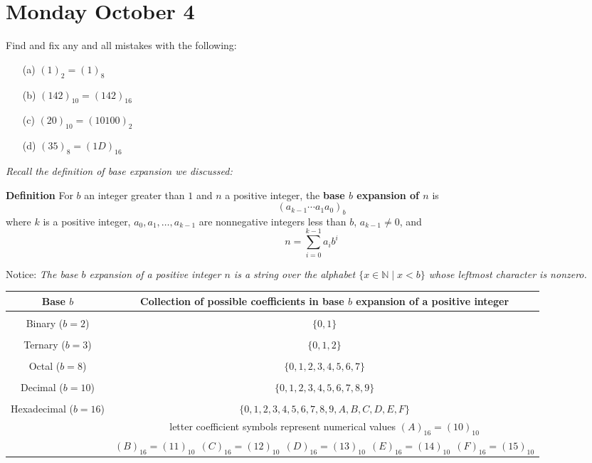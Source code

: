 \documentclass[12pt, oneside]{article}
\newcommand{\st}{\mid}
\begin{document}
\begin{flushright}
\end{flushright} 


\section*{Monday October 4}


Find and fix any and all mistakes with the following:
\begin{itemize}
\item[(a)] $(1)_2 = (1)_8$
\item[(b)] $(142)_{10} = (142)_{16}$
\item[(c)] $(20)_{10} = (10100)_2$
\item[(d)] $(35)_8 = (1D)_{16}$
\end{itemize} 

{\it Recall the definition of base expansion we discussed:}



{\bf Definition} For $b$ an integer greater than $1$ and $n$ a positive integer, 
the {\bf base $b$ expansion of $n$}  is
\[
(a_{k-1} \cdots a_1 a_0)_b
\]
where $k$ is a positive integer, $a_0, a_1, \ldots, a_{k-1}$ 
are nonnegative integers less than $b$, $a_{k-1} \neq  0$, and
\[
n =  \sum_{i=0}^{k-1} a_{i} b^{i}
\]

Notice: {\it The base $b$ expansion of a positive integer $n$ is a string over the alphabet 
$\{x \in \mathbb{N} \st x < b\}$
whose leftmost character is nonzero.}

\begin{center}
\begin{tabular}{|c|c|}
\hline
Base $b$ & Collection of possible coefficients in base $b$ expansion of  a positive integer \\
\hline
& \\
Binary ($b=2$) & $\{0,1\}$ \\
\hline
& \\
Ternary ($b=3$) & $\{0,1, 2\}$ \\
\hline
& \\
Octal ($b=8$) & $\{0,1, 2, 3, 4, 5, 6, 7\}$\\
\hline
& \\
Decimal ($b=10$) & $\{0,1, 2, 3, 4, 5, 6, 7, 8, 9\}$\\
\hline
& \\
Hexadecimal ($b=16$) &  $\{0,1, 2, 3, 4, 5, 6, 7, 8, 9, A, B, C, D, E, F\}$\\
& letter coefficient symbols represent numerical values $(A)_{16} = (10)_{10}$\\
&$(B)_{16} = (11)_{10} ~~(C)_{16} = (12)_{10} ~~
 (D)_{16} = (13)_{10} ~~ (E)_{16} = (14)_{10} ~~ (F)_{16} = (15)_{10} $\\
\hline
\end{tabular}
\end{center}
\end{document}
